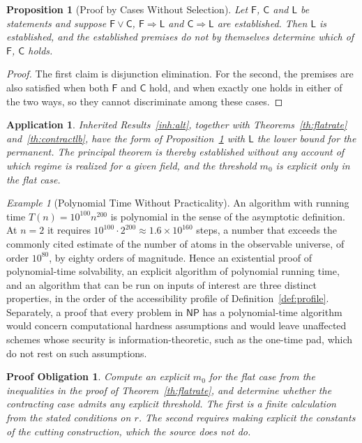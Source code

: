 \documentclass[11pt,letterpaper]{report}
\theoremstyle{plain}
\newtheorem{proposition}[theorem]{Proposition}
\newtheorem{obligation}[theorem]{Proof Obligation}
\newtheorem{application}[theorem]{Application}
\theoremstyle{definition}
\theoremstyle{remark}
\newtheorem{example}[theorem]{Example}
\begin{document}
\begin{proposition}[Proof by Cases Without Selection]\label{pr:cases}
Let $\mathsf F$, $\mathsf C$ and $\mathsf L$ be statements and suppose $\mathsf F\lor\mathsf C$, $\mathsf F\Rightarrow\mathsf L$ and $\mathsf C\Rightarrow\mathsf L$ are established. Then $\mathsf L$ is established, and the established premises do not by themselves determine which of $\mathsf F$, $\mathsf C$ holds.
\end{proposition}
\begin{proof}
The first claim is disjunction elimination. For the second, the premises are also satisfied when both $\mathsf F$ and $\mathsf C$ hold, and when exactly one holds in either of the two ways, so they cannot discriminate among these cases.
\end{proof}

\begin{application}\label{app:regime}
Inherited Results~\ref{inh:alt}, together with Theorems~\ref{th:flatrate} and~\ref{th:contractlb}, have the form of Proposition~\ref{pr:cases} with $\mathsf L$ the lower bound for the permanent. The principal theorem is thereby established without any account of which regime is realized for a given field, and the threshold $m_0$ is explicit only in the flat case.
\end{application}

\begin{example}[Polynomial Time Without Practicality]\label{ex:polyimpractical}
An algorithm with running time $T(n)=10^{100}n^{200}$ is polynomial in the sense of the asymptotic definition. At $n=2$ it requires $10^{100}\cdot2^{200}\approx1.6\times10^{160}$ steps, a number that exceeds the commonly cited estimate of the number of atoms in the observable universe, of order $10^{80}$, by eighty orders of magnitude. Hence an existential proof of polynomial-time solvability, an explicit algorithm of polynomial running time, and an algorithm that can be run on inputs of interest are three distinct properties, in the order of the accessibility profile of Definition~\ref{def:profile}. Separately, a proof that every problem in $\mathsf{NP}$ has a polynomial-time algorithm would concern computational hardness assumptions and would leave unaffected schemes whose security is information-theoretic, such as the one-time pad, which do not rest on such assumptions.
\end{example}

\begin{obligation}\label{ob:threshold}
Compute an explicit $m_0$ for the flat case from the inequalities in the proof of Theorem~\ref{th:flatrate}, and determine whether the contracting case admits any explicit threshold. The first is a finite calculation from the stated conditions on $r$. The second requires making explicit the constants of the cutting construction, which the source does not do.
\end{obligation}
\end{document}
